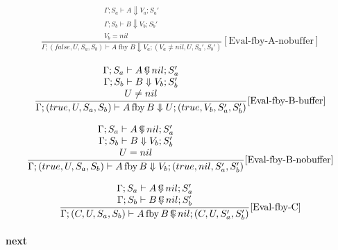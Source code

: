 \documentclass{scrartcl}
\DeclareMathOperator{\fby}{fby}
\DeclareMathOperator{\ceval}{\overset{C}{\smash{\Downarrow}}}
\begin{document}
    \begin{align*}
    \frac{
        \begin{matrix}
        \Gamma; S_a \vdash A \Downarrow V_a; S_a' \\
        \Gamma; S_b \vdash B \Downarrow V_b; S_b' \\
        V_b = nil
        \end{matrix}
    }{
        \Gamma; (false, U, S_a, S_b) \vdash A \fby B \Downarrow V_a; (V_a \neq nil, U, S_a', S_b')
    }[\text{Eval-fby-A-nobuffer}]
    \end{align*}
    
    \begin{align*}
    \frac{
        \begin{matrix}
        \Gamma; S_a \vdash A \ceval nil; S_a' \\
        \Gamma; S_b \vdash B \Downarrow V_b; S_b' \\
        U \neq nil
        \end{matrix}
    }{
        \Gamma; (true, U, S_a, S_b) \vdash A \fby B \Downarrow U; (true, V_b, S_a', S_b')
    }[\text{Eval-fby-B-buffer}]
    \end{align*}
    
    \begin{align*}
    \frac{
        \begin{matrix}
        \Gamma; S_a \vdash A \ceval nil; S_a' \\
        \Gamma; S_b \vdash B \Downarrow V_b; S_b' \\
        U = nil
        \end{matrix}
    }{
        \Gamma; (true, U, S_a, S_b) \vdash A \fby B \Downarrow V_b; (true, nil, S_a', S_b')
    }[\text{Eval-fby-B-nobuffer}]
    \end{align*}
    
    \begin{align*}
    \frac{
        \begin{matrix}
        \Gamma; S_a \vdash A \ceval nil; S_a' \\
        \Gamma; S_b \vdash B \ceval nil; S_b'
        \end{matrix}
    }{
        \Gamma; (C, U, S_a, S_b) \vdash A \fby B \ceval nil; (C, U, S_a', S_b')
    }[\text{Eval-fby-C}]
    \end{align*}
    
    \paragraph{next}
    
\end{document}
